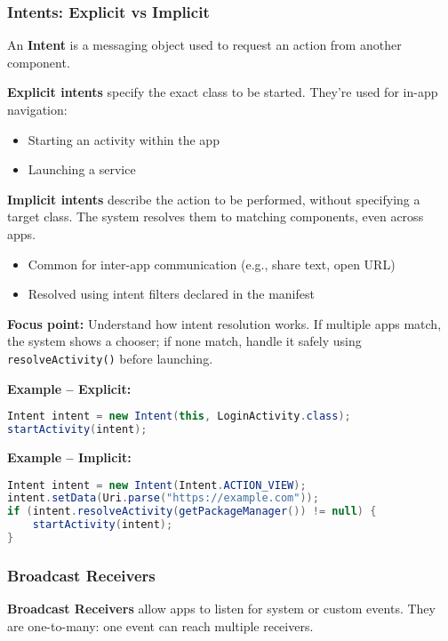 \documentclass[a4paper,12pt]{article}
\begin{document}
\subsubsection{Intents: Explicit vs Implicit}

An \textbf{Intent} is a messaging object used to request an action from another component.

\textbf{Explicit intents} specify the exact class to be started. They're used for in-app navigation:
\begin{itemize}
  \item Starting an activity within the app
  \item Launching a service
\end{itemize}

\textbf{Implicit intents} describe the action to be performed, without specifying a target class. The system resolves them to matching components, even across apps.

\begin{itemize}
  \item Common for inter-app communication (e.g., share text, open URL)
  \item Resolved using intent filters declared in the manifest
\end{itemize}

\textbf{Focus point:} Understand how intent resolution works. If multiple apps match, the system shows a chooser; if none match, handle it safely using \texttt{resolveActivity()} before launching.

\textbf{Example – Explicit:}
\begin{lstlisting}[language=Java]
Intent intent = new Intent(this, LoginActivity.class);
startActivity(intent);
\end{lstlisting}

\textbf{Example – Implicit:}
\begin{lstlisting}[language=Java]
Intent intent = new Intent(Intent.ACTION_VIEW);
intent.setData(Uri.parse("https://example.com"));
if (intent.resolveActivity(getPackageManager()) != null) {
    startActivity(intent);
}
\end{lstlisting}

\subsubsection{Broadcast Receivers}

\textbf{Broadcast Receivers} allow apps to listen for system or custom events. They are one-to-many: one event can reach multiple receivers.
\end{document}
